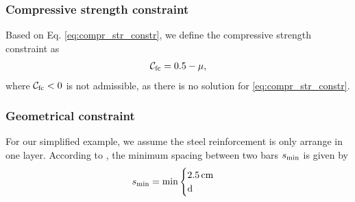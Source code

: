 \subsubsection{Compressive strength constraint}
Based on Eq. \ref{eq:compr_str_constr}, we define the compressive strength constraint as
\begin{align}
	\mathcal{C}_{\text{fc}} = 0.5 - \mu, 
\end{align}
where $\mathcal{C}_{\text{fc}} < 0$ is not admissible, as there is no solution for \ref{eq:compr_str_constr}.
\subsubsection{Geometrical constraint}
For our simplified example, we assume the steel reinforcement is only arrange in one layer.
According to \citeauthor{DIN1992-1-1}, the minimum spacing between two bars $s_{\text{min}}$ is given by
\begin{equation}
	\beamMinSpacing = \min
	\begin{cases}
		\inputconcretecover \,\text{\inputconcretecoverunit}\\
		$\beamSteelDiameter$
	\end{cases}       
\end{equation}